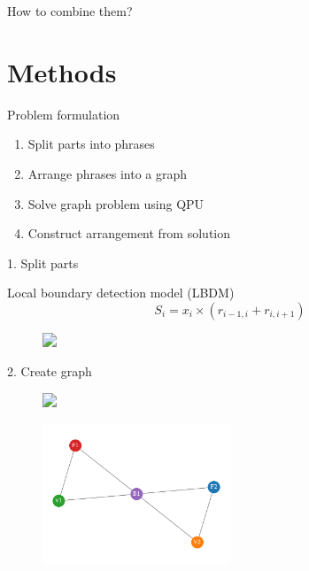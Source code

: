 \documentclass[handout]{beamer}
\begin{document}
\begin{frame}[standout]
    \centering
    How to combine them?
\end{frame}

\section{Methods} %

\begin{frame}{Problem formulation}
    \begin{enumerate}
        \item<2-> Split parts into phrases
        \item<3-> Arrange phrases into a graph
        \item<4-> Solve graph problem using QPU
        \item<5-> Construct arrangement from solution
    \end{enumerate}
\end{frame}

\begin{frame}{1. Split parts}
    \begin{block}{}
        \centering
        Local boundary detection model (LBDM)
        \begin{equation*}
            S_i=x_i\times (r_{i-1, i} + r_{i, i+1})
        \end{equation*}
    \end{block}
    \begin{figure}
        \centering
        \includegraphics<1->[width=0.8\textwidth]{../Figures/toy-1.png}
    \end{figure}
\end{frame}

\begin{frame}{2. Create graph}

    \begin{figure}
        \centering
        \includegraphics<1->[width=0.8\textwidth]{../Figures/toy-1.png}
    \end{figure}
    \begin{figure}
        \centering
        \includegraphics[width=0.5\textwidth]{../Figures/toy_graph.pdf}
    \end{figure}
\end{frame}
\end{document}
